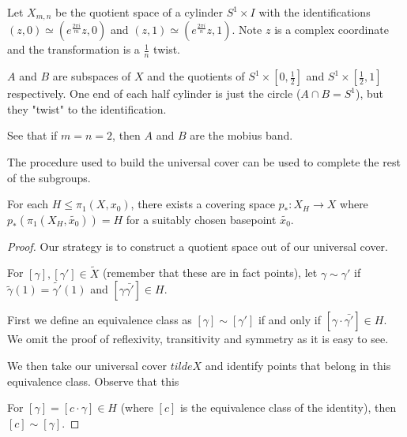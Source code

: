 \documentclass[10pt]{article}
\begin{document}
\begin{example}
	Let $X_{m,n}$ be the quotient space of a cylinder $S^1 \times I$ with the
identifications $(z, 0) \simeq (e^{\frac{2\pi i}{m}}z, 0)$ and $(z, 1) \simeq
(e^{\frac{2\pi i}{n}}z, 1)$. Note $z$ is a complex coordinate and the
transformation is a $\frac{1}{n}$ twist.

	$A$ and $B$ are subspaces of $X$ and the quotients of $S^1 \times [0, \frac{1}{2}]$ and $S^1
	\times [\frac{1}{2}, 1]$ respectively. One end of each half cylinder is just
	the circle ($A \cap B = S^1$), but they "twist" to the identification.

	See that if $m = n = 2$, then $A$ and $B$ are the mobius band.

\end{example}

The procedure used to build the universal cover can be used to complete the
rest of the subgroups.

\begin{theorem}
	For each $H \leq \pi_1(X, x_0)$, there exists a covering space $p_*: X_H \to
	X$ where $p_*(\pi_1(X_H, \tilde{x_0})) = H$ for a suitably chosen basepoint
	$\tilde{x_0}$. 
\end{theorem}

\begin{proof}

	Our strategy is to construct a quotient space out of our universal cover.

	For $[\gamma], [\gamma'] \in \tilde{X}$ (remember that these are in fact
	points), let $\gamma \sim \gamma'$ if $\tilde{\gamma}(1) =
	\tilde{\gamma'}(1)$ and $[\gamma \bar{\gamma'}] \in H$.

	First we define an equivalence class as $[\gamma] \sim [\gamma']$ if and only
	if $[\gamma \cdot \bar{\gamma'}] \in H$. We omit the proof of reflexivity,
	transitivity and symmetry as it is easy to see.

	We then take our universal cover $tilde{X}$ and identify points that belong
	in this equivalence class. Observe that this 

	For $[\gamma] = [c \cdot \gamma] \in H$ (where $[c]$ is the equivalence class
	of the identity), then $[c] \sim [\gamma]$.

\end{proof}
\end{document}
